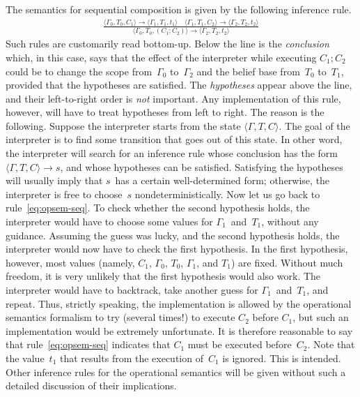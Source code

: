 \documentclass[a4paper,12pt,oneside,fleqn]{book} %
\begin{document}
The semantics for sequential composition is given by the following
inference rule.
\begin{align}
\frac
  {\langle\Gamma_0,T_0,C_1\rangle\to\langle\Gamma_1,T_1,t_1\rangle
  \quad
  \langle\Gamma_1,T_1,C_2\rangle\to\langle\Gamma_2,T_2,t_2\rangle}
  {\langle\Gamma_0,T_0,(C_1;C_2)\rangle\to\langle\Gamma_2,T_2,t_2\rangle}
  \label{eq:opsem-seq}
\end{align}
Such rules are customarily read bottom-up. Below the line is the
\emph{conclusion} which, in this case, says that the effect of the
interpreter while executing $C_1;C_2$ could be to change the scope
from~$\Gamma_0$ to~$\Gamma_2$ and the belief base from~$T_0$ to~$T_1$,
provided that the hypotheses are satisfied. The \emph{hypotheses} appear
above the line, and their left-to-right order is \emph{not} important. Any
implementation of this rule, however, will have to treat hypotheses from
left to right. The reason is the following. Suppose the interpreter starts
from the state $\langle\Gamma,T,C\rangle$. The goal of the interpreter is
to find some transition that goes out of this state. In other word, the
interpreter will search for an inference rule whose conclusion has the form
$\langle\Gamma,T,C\rangle\to s$, and whose hypotheses can be satisfied.
Satisfying the hypotheses will usually imply that $s$~has a certain
well-determined form; otherwise, the interpreter is free to choose~$s$
nondeterministically. Now let us go back to rule~\eqref{eq:opsem-seq}. To
check whether the second hypothesis holds, the interpreter would have to
choose some values for $\Gamma_1$~and~$T_1$, without any guidance.
Assuming the guess was lucky, and the second hypothesis holds, the
interpreter would now have to check the first hypothesis. In the first
hypothesis, however, most values (namely, $C_1$, $\Gamma_0$, $T_0$,
$\Gamma_1$, and $T_1$) are fixed. Without much freedom, it is very unlikely
that the first hypothesis would also work. The interpreter would have to
backtrack, take another guess for $\Gamma_1$~and~$T_1$, and repeat. Thus,
strictly speaking, the implementation is allowed by the operational
semantics formalism to try (several times!) to execute $C_2$ before $C_1$,
but such an implementation would be extremely unfortunate. It is therefore
reasonable to say that rule~\eqref{eq:opsem-seq} indicates that $C_1$ must
be executed before~$C_2$. Note that the value~$t_1$ that results from the
execution of~$C_1$ is ignored. This is intended.  Other inference rules for
the operational semantics will be given without such a detailed discussion
of their implications.
\end{document}
